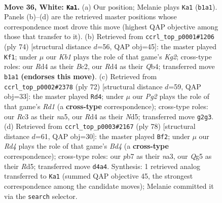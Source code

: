 \documentclass[11pt]{article}
\begin{document}
\clearpage

\begin{figure}[p]\centering
\begin{subfigure}{0.46\textwidth}\centering
\resizebox{\linewidth}{!}{%
\newchessgame
\chessboard[
  setfen={4r3/kp1np3/1r1p4/6Q1/3RP3/1PR2P2/4b1PP/1K6 w - - 1 36},
  showmover=false,
  pgfstyle=straightmove, color=movearrow, markmove={b1-a1}
]}
\caption{}
\end{subfigure}\hfill
\begin{subfigure}{0.46\textwidth}\centering
\resizebox{\linewidth}{!}{%
\newchessgame
\chessboard[
  setfen={8/1p4k1/p1p2r2/P3r1n1/1Q2p1b1/2P5/1PBR1PK1/8 w - - 6 38},
  showmover=false,
  pgfstyle=straightmove, color=movearrow, markmove={g2-f1}
]}
\caption{}
\end{subfigure}
\\[4pt]
\begin{subfigure}{0.46\textwidth}\centering
\resizebox{\linewidth}{!}{%
\newchessgame
\chessboard[
  setfen={4rr2/6kp/5pp1/n2N4/p3P3/2P2R1P/6P1/3R2K1 w - - 1 37},
  showmover=false,
  pgfstyle=straightmove, color=movearrow, markmove={d1-d4}
]}
\caption{}
\end{subfigure}\hfill
\begin{subfigure}{0.46\textwidth}\centering
\resizebox{\linewidth}{!}{%
\newchessgame
\chessboard[
  setfen={2r1r2k/6pp/p4p2/3R1P2/3BP3/n7/P5KP/4R3 w - - 6 40},
  showmover=false,
  pgfstyle=straightmove, color=movearrow, markmove={d4-f2}
]}
\caption{}
\end{subfigure}
\caption{\textbf{Move 36, White: \texttt{Ka1}.} (a) Our position; Melanie plays \texttt{Ka1} (\texttt{b1a1}). Panels (b)--(d) are the retrieved master positions whose correspondence most drove this move (highest QAP objective among those that transfer to it). (b) Retrieved from \texttt{ccrl\_top\_p0001\#1206} (ply 74) [structural distance $d$=56, QAP obj=45]: the master played \texttt{Kf1}; under $\mu$ our \emph{Kb1} plays the role of that game's \emph{Kg2}; cross-type roles: our \emph{R}d4 as their \emph{B}c2, our \emph{R}d4 as their \emph{Q}b4; transferred move \texttt{b1a1} \textbf{(endorses this move)}. (c) Retrieved from \texttt{ccrl\_top\_p0002\#2378} (ply 72) [structural distance $d$=59, QAP obj=33]: the master played \texttt{Rd4}; under $\mu$ our \emph{Pg2} plays the role of that game's \emph{Rd1} (a \textbf{cross-type} correspondence); cross-type roles: our \emph{R}c3 as their \emph{n}a5, our \emph{R}d4 as their \emph{N}d5; transferred move \texttt{g2g3}. (d) Retrieved from \texttt{ccrl\_top\_p0003\#2167} (ply 78) [structural distance $d$=61, QAP obj=30]: the master played \texttt{Bf2}; under $\mu$ our \emph{Rd4} plays the role of that game's \emph{Bd4} (a \textbf{cross-type} correspondence); cross-type roles: our \emph{p}b7 as their \emph{n}a3, our \emph{Q}g5 as their \emph{R}d5; transferred move \texttt{d4a4}. Synthesis: 1 retrieved analog transferred to \texttt{Ka1} (summed QAP objective 45, the strongest correspondence among the candidate moves); Melanie committed it via the \texttt{search} selector.}
\label{fig:thought-m70}
\end{figure}
\end{document}
